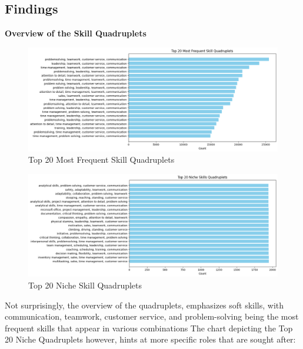 \documentclass{article}
\begin{document}
\subsection{Findings}

\vspace{0.5cm}
\textbf{Overview of the Skill Quadruplets}

\vspace{0.3cm}
\begin{figure}[H]
    \centering
    \includegraphics[width=1\linewidth]{download (28).png}
    \caption{Top 20 Most Frequent Skill Quadruplets}
    \label{fig:skill_pairs_1}
\end{figure}

\vspace{0.3cm}
\begin{figure}[H]
    \centering
    \includegraphics[width=1\linewidth]{download (29).png}
    \caption{Top 20 Niche Skill Quadruplets}
    \label{fig:skill_pairs_2}
\end{figure}

\vspace{0.3cm}
Not surprisingly, the overview of the quadruplets, emphasizes soft skills, with communication, teamwork, customer service, and problem-solving being the most frequent skills that appear in various combinations
The chart depicting the Top 20 Niche Quadruplets however, hints at more specific roles that are sought after:
\end{document}
